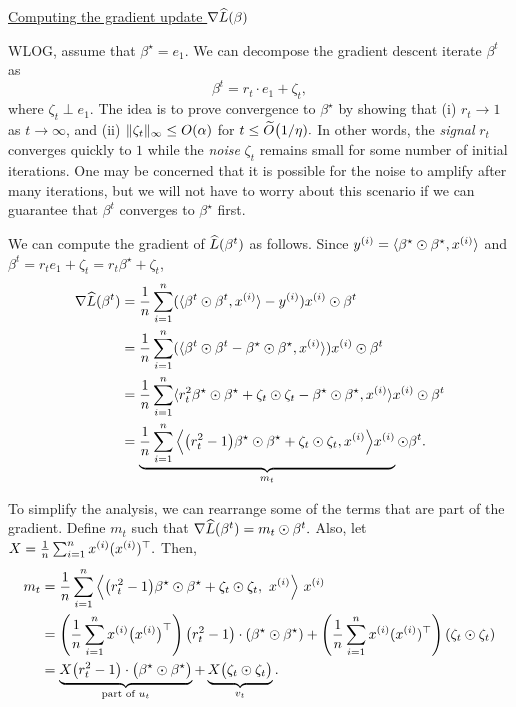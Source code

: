 \underline{Computing the gradient update $\nabla \empL$}

WLOG, assume that $\beta^\star = e_{1}.$ We can decompose the gradient descent iterate $\beta^{t}$ as
\begin{equation}
    \beta^{t} = r_{t} \cdot e_{1} + \zeta_{t},
\end{equation}
where $\zeta_t \perp e_1$. The idea is to prove convergence to $\beta^\star$ by showing that (i) $r_{t} \rightarrow 1$ as $t \rightarrow \infty$, and (ii) $\norm{\zeta_{t}}_{\infty} \leq O(\alpha)$ for $t \leq \tilO\big(1/\eta).$ In other words, the \textit{signal} $r_{t}$ converges quickly to $1$ while the \textit{noise} $\zeta_t$ remains small for some number of initial iterations. One may be concerned that it is possible for the noise to amplify after many iterations, but we will not have to worry about this scenario if we can guarantee that $\beta^{t}$ converges to $\beta^\star$ first.

We can compute the gradient of $\empLt$ as follows. Since $y\sp{i} = \langle \beta^\star \odot \beta^\star, x\sp{i} \rangle$ and $\beta^{t} = r_{t}e_{1} + \zeta_{t} = r_{t}\beta^\star + \zeta_{t}$,
\begin{align}
    \nabla \empLt &= \frac{1}{n} \sum_{i=1}^{n} (\langle \beta^{t} \odot \beta^{t}, x\sp{i} \rangle - y\sp{i} ) x\sp{i} \odot \beta^{t} \\
    &= \frac{1}{n} \sum_{i=1}^{n} ( \langle \beta^{t} \odot \beta^{t} - \beta^\star \odot \beta^\star, x\sp{i} \rangle ) x\sp{i} \odot \beta^{t} \\
    &= \frac{1}{n} \sum_{i=1}^{n} \langle r_{t}^{2} \beta^\star \odot \beta^\star + \zeta_{t} \odot \zeta_{t} - \beta^\star \odot \beta^\star, x\sp{i}  \rangle x\sp{i} \odot \beta^{t} \\
    &= \underbrace{\frac{1}{n} \sum_{i=1}^{n} \Big\langle \big(r_{t}^{2} - 1\big) \beta^\star \odot \beta^\star + \zeta_{t} \odot \zeta_{t}, x\sp{i}  \Big\rangle x\sp{i}}_{m_t} \odot \beta^{t}.
\end{align}

To simplify the analysis, we can rearrange some of the terms that are part of the gradient. Define $m_{t} $ such that $\nabla \empLt = m_{t} \odot \beta^{t}.$ Also, let $X = \frac{1}{n} \sum_{i=1}^{n} x\sp{i}(x\sp{i})^\top.$ Then,
\begin{align}
    m_{t} &= \frac{1}{n} \sum_{i=1}^{n} \Big\langle \big(r_{t}^{2} - 1\big) \beta^\star \odot \beta^\star + \zeta_{t} \odot \zeta_{t}, \ x\sp{i}  \Big\rangle \ x\sp{i} \\
    &= \l( \frac{1}{n} \sum_{i=1}^{n} x\sp{i}\big(x\sp{i}\big)^\top \r) \l(r_{t}^{2} - 1\r) \cdot \l(\beta^\star \odot \beta^\star\r) + \l( \frac{1}{n} \sum_{i=1}^{n} x\sp{i}(x\sp{i})^\top \r) \l(\zeta_{t} \odot \zeta_{t}\r) \\
    &= \underbrace{X \big(r_{t}^{2} - 1\big) \cdot \big(\beta^\star \odot \beta^\star\big)}_{\text{part of } u_t} + \underbrace{X \big(\zeta_{t} \odot \zeta_{t}\big)}_{v_t}.
\end{align}

